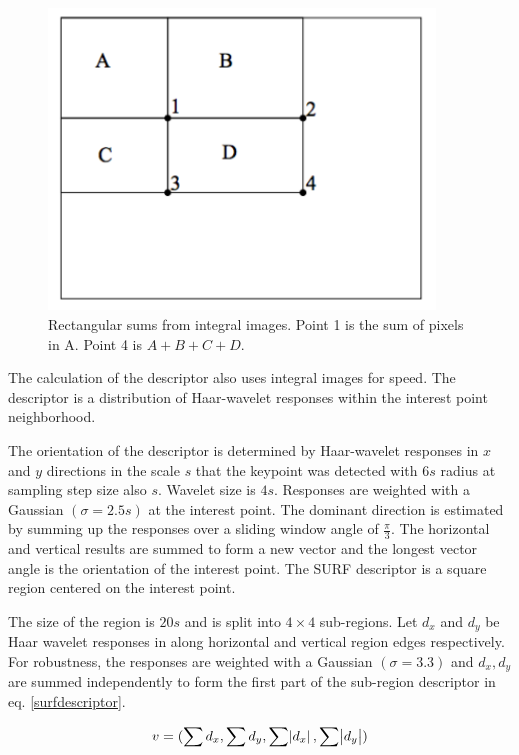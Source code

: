 \documentclass[english,12pt,a4paper,pdftex,elec,utf8, table]{aaltothesis}
\begin{document}
\begin{figure}[htb]
\begin{center}
\includegraphics[height=8cm]{figures/integralimage}
\end{center}
\caption{Rectangular sums from integral images. Point 1 is the sum of pixels in A. Point 4 is $A + B + C + D$.\cite{Viola2001}}
\label{integralimagefig}
\end{figure}

The calculation of the descriptor also uses integral images for speed. The descriptor is a distribution of Haar-wavelet responses within the interest point neighborhood. \cite{Bay2006}

The orientation of the descriptor is determined by Haar-wavelet responses in $x$ and $y$ directions in the scale $s$ that the keypoint was detected with $6s$ radius at sampling step size also $s$. Wavelet size is $4s$. Responses are weighted with a Gaussian $(\sigma = 2.5s)$ at the interest point. The dominant direction is estimated by summing up the responses over a sliding window angle of $\frac{\pi}{3}$. The horizontal and vertical results are summed to form a new vector and the longest vector angle is the orientation of the interest point. The SURF descriptor is a square region centered on the interest point. \cite{Bay2006}

The size of the region is $20s$ and is split into $4 \times 4$ sub-regions. Let $d_x$ and $d_y$ be Haar wavelet responses in along horizontal and vertical region edges respectively. For robustness, the responses are weighted with a Gaussian $(\sigma = 3.3)$ and $d_x, d_y$ are summed independently to form the first part of the sub-region descriptor in eq. \ref{surfdescriptor}. \cite{Bay2006}

\begin{equation}
  \label{surfdescriptor}
v = (\sum d_x, \sum d_y, \sum \abs{d_x}, \sum \abs{d_y})
  \end{equation}
\end{document}
